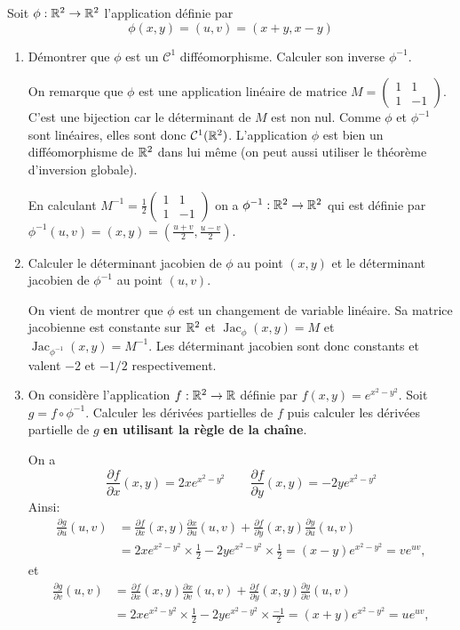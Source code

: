 \documentclass{tp_um}
\begin{document}
\exo{} Soit $\phi:\mathbb{R}^2\to\mathbb{R}^2$ l'application définie par 
\[
		\phi(x,y) = (u,v) = (x+y,x-y) 
\]
\begin{enumerate}
	\item Démontrer que $\phi$ est un $\mathcal C^1$ difféomorphisme. Calculer son inverse $\phi^{-1}$.
	
	\bigskip 
		On remarque que $\phi$ est une application linéaire de matrice $M =\begin{pmatrix}1 & 1 \\ 1& -1 \end{pmatrix}$. C'est une bijection  car le déterminant de $M$ est non nul. Comme $\phi$ et $\phi^{-1}$ sont linéaires, elles sont donc $\mathcal C^{1}(\mathbb{R}^2)$. L'application $\phi$ est bien un difféomorphisme de $\mathbb{R}^2$ dans lui même (on peut aussi utiliser le théorème d'inversion globale).
		
		En calculant $M^{-1} = \frac 1 2 \begin{pmatrix} 1 & 1\\ 1 & -1 \end{pmatrix}$ on a $\phi^{-1}: \mathbb{R}^2 \to \mathbb{R}^2$ qui est définie par $\phi^{-1} (u,v) = (x,y)=(\frac{u+v}{2}, \frac{u-v}{2})$.
	\bigskip
	
	\item Calculer le déterminant jacobien de $\phi$ au point $(x,y)$ et le déterminant jacobien de $\phi^{-1}$ au point $(u,v)$.
	
	\bigskip
	On vient de montrer que $\phi$ est un changement de variable linéaire. Sa matrice jacobienne est constante sur $\mathbb{R}^2$ et $\operatorname{Jac}_\phi (x,y) = M$ et $ \operatorname{Jac}_{\phi^{-1}} (x,y) = M^{-1}$. Les déterminant jacobien sont donc constants et valent $-2$ et $-1/2$ respectivement. 
	
	\bigskip
	
	\item On considère l'application $f: \mathbb{R}^2 \to \mathbb{R}$  définie par $f(x,y) = e^{x^2 -y^2}$. Soit
		$g = f \circ \phi^{-1}$. Calculer les dérivées partielles de $f$ puis calculer les dérivées partielle de $g$ {\bfseries en utilisant la règle de la chaîne}.

\bigskip
On a  
\[
\frac{\partial f}{\partial x}(x,y)  = 2xe^{x^2-y^2}  \qquad \frac{\partial f}{\partial y}(x,y) = - 2y e^{x^2-y^2} 
\]
Ainsi:
\begin{align*}
	\frac{\partial g}{\partial u}(u,v)& = \frac{\partial f}{\partial x}(x,y) \frac{\partial x}{\partial u}(u,v) + \frac{\partial f}{\partial y}(x,y) \frac{\partial y}{\partial u}(u,v) \\ & = 2xe^{x^2-y^2} \times \frac 1 2 - 2y e^{x^2-y^2} \times \frac 1 2  =  (x-y) e^{x^2 - y^2} = v e^{uv},
\end{align*}
et
\begin{align*}
	\frac{\partial g}{\partial v}(u,v)& = \frac{\partial f}{\partial x}(x,y) \frac{\partial x}{\partial v}(u,v) + \frac{\partial f}{\partial y}(x,y) \frac{\partial y}{\partial v}(u,v) \\ & = 2xe^{x^2-y^2} \times \frac 1 2 - 2y e^{x^2-y^2} \times \frac {-1}{2}  =  (x+y) e^{x^2 - y^2} = u e^{uv},
\end{align*}
\bigskip


\end{enumerate}
\end{document}

